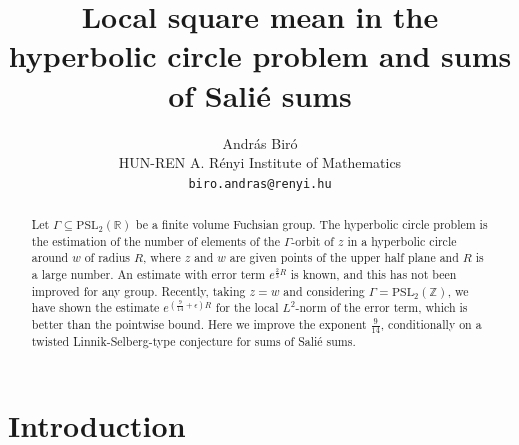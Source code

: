 \documentclass[12pt]{amsart}
\title{Local square mean in the hyperbolic circle problem and sums of Salié sums}
\author{
    András Biró\\
    HUN-REN A. Rényi Institute of Mathematics\\
    \texttt{biro.andras@renyi.hu}
}
\theoremstyle{definition}
\numberwithin{equation}{section}
\newcommand{\PSL}{\mathrm{PSL}}
\newcommand{\ZZ}{\mathbb{Z}}
\newcommand{\RR}{\mathbb{R}}
\newcommand{\PSLR}{\PSL_2(\RR)}
\newcommand{\PSLZ}{\PSL_2(\ZZ)}
\begin{document}
\begin{abstract}
Let $\Gamma\subseteq \PSLR$ be a finite volume Fuchsian group. The hyperbolic circle problem is the
estimation of the number of elements of the $\Gamma$-orbit of
$z$ in a hyperbolic circle around $w$ of radius $R$, where $z$ and
$w$ are given points of the upper half plane and $R$ is a
large number. An estimate with error term $e^{\frac 23R}$ is
known, and this has not been improved for any group. Recently, taking $
z=w$ and considering $\Gamma =\PSLZ$, we have shown the estimate $
e^{\left(\frac 9{14}+\epsilon\right)R}$  for the local $L^2$-norm of the error term, which is better than the pointwise bound. Here we improve the exponent
$\frac 9{14}$, conditionally on a twisted Linnik-Selberg-type conjecture for sums of Salié sums.



\end{abstract}


\maketitle



\section{Introduction}
\end{document}
